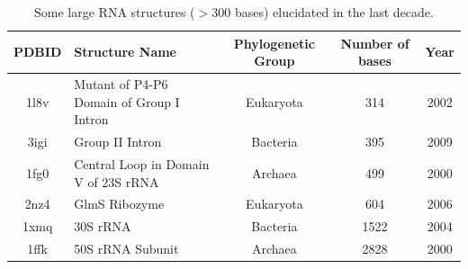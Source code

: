 \begin{table}[htbp]
\begin{center}
{\small
\begin{tabular}{c|p{5cm}|c|c|c}
\hline
\bf{PDBID} & \bf{Structure Name} & \bf{Phylogenetic Group} & \bf{Number of bases} & \bf{Year} \\ \hline
1l8v & Mutant of P4-P6 Domain of Group I Intron & Eukaryota & 314 & 2002 \\ \hline
3igi & Group II Intron & Bacteria & 395 & 2009 \\ \hline
1fg0 & Central Loop in Domain V of 23S rRNA & Archaea & 499 & 2000 \\ \hline
2nz4 & GlmS Ribozyme & Eukaryota & 604 & 2006 \\ \hline
1xmq & 30S rRNA & Bacteria & 1522 & 2004 \\ \hline
1ffk & 50S rRNA Subunit & Archaea & 2828 & 2000 \\ \hline
\end{tabular}
}
\caption{Some large  RNA structures  ($>$300 bases) elucidated  in the
  last decade.}
\end{center}
\label{tab:rnarange}
\end{table}

